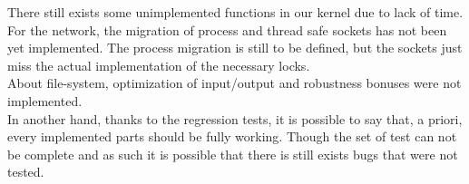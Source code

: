 There still exists some unimplemented functions in our kernel due to lack of
time.\\
For the network, the migration of process and thread safe sockets has
not been yet implemented. The process migration is still to be defined, but the
sockets just miss the actual implementation of the necessary locks.\\

About file-system, optimization of input/output and robustness bonuses were not
implemented.\\
In another hand, thanks to the regression tests, it is possible
to say that, a priori, every implemented parts should be fully working. Though the set
of test can not be complete and as such it is possible that there is
still exists bugs that were not tested.\\
